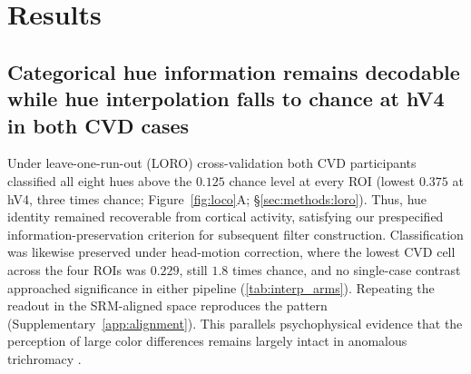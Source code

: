 
\section{Results}
\label{sec:results}

\subsection{Categorical hue information remains decodable while hue interpolation falls to chance at hV4 in both CVD cases}
\label{sec:results:loro}
\label{sec:results:loco}

Under leave-one-run-out (LORO) cross-validation both CVD participants classified all eight hues above the $0.125$ chance level at every ROI (lowest $0.375$ at hV4, three times chance; Figure~\ref{fig:loco}A; \S\ref{sec:methods:loro}). Thus, hue identity remained recoverable from cortical activity, satisfying our prespecified information-preservation criterion for subsequent filter construction. Classification was likewise preserved under head-motion correction, where the lowest CVD cell across the four ROIs was $0.229$, still $1.8$ times chance, and no single-case contrast approached significance in either pipeline (\cref{tab:interp_arms}). Repeating the readout in the SRM-aligned space reproduces the pattern (Supplementary~\cref{app:alignment}). This parallels psychophysical evidence that the perception of large color differences remains largely intact in anomalous trichromacy \parencite{boehm2014}.

